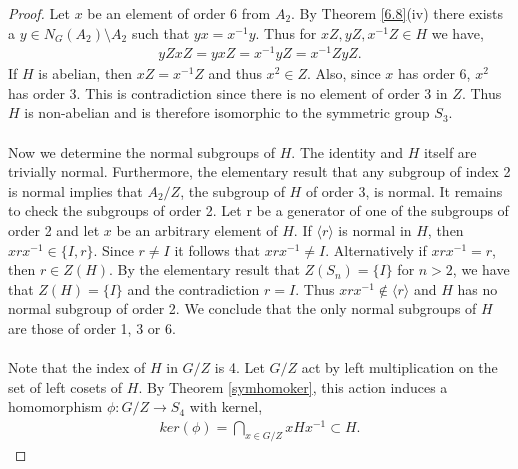 \documentclass[a4paper , 11pt]{book}
\theoremstyle{definition}
\theoremstyle{remark}
\begin{document}
\begin{proof}
Let $x$ be an element of order 6 from $A_2$. By Theorem \ref{6.8}(iv) there exists a $y \in N_G(A_2) \! \setminus \! A_2$ such that $y x = x^{-1} y$. Thus for $xZ, yZ, x^{-1}Z \in H$ we have,
\begin{align*} yZ xZ = yxZ =  x^{-1}yZ = x^{-1}Z yZ.
\end{align*}
If $H$ is abelian, then $xZ = x^{-1}Z$ and thus $x^2 \in Z$. Also, since $x$ has order 6, $x^2$ has order 3. This is contradiction since there is no element of order 3 in $Z$. Thus $H$ is non-abelian and is therefore isomorphic to the symmetric group $S_3$. \\
\\
Now we determine the normal subgroups of $H$. The identity and $H$ itself are trivially normal. Furthermore, the elementary result that any subgroup of index 2 is normal implies that $A_2 / Z$, the subgroup of $H$ of order 3, is normal. It remains to check the subgroups of order 2. Let r be a generator of one of the subgroups of order 2 and let $x$ be an arbitrary element of $H$. If $\langle r \rangle$ is normal in $H$, then $x r x^{-1} \in \{ I , r \}$. Since $r \neq I$ it follows that $x r x^{-1} \neq I$. Alternatively if $x r x^{-1} = r$, then $r \in Z(H)$. By the elementary result that $Z(S_n) = \{ I \}$ for $n > 2$, we have that $Z(H) = \{ I \}$ and the contradiction $r=I$. Thus $x r x^{-1} \not \in \langle r \rangle$ and $H$ has no normal subgroup of order 2. We conclude that the only normal subgroups of $H$ are those of order 1, 3 or 6. \\
\\
Note that the index of $H$ in $G / Z$ is 4. Let $G / Z$ act by left multiplication on the set of left cosets of $H$. By Theorem \ref{symhomoker}, this action induces a homomorphism $\phi : G / Z \longrightarrow S_4$ with kernel,
\begin{align*} ker(\phi) = \bigcap\limits_{x \in G / Z} x H x^{-1}  \subset H.
\end{align*}


\end{proof}
\end{document}
